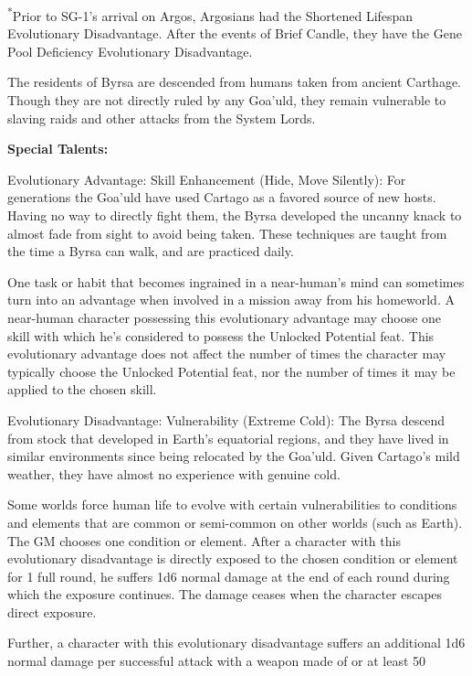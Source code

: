 \textsuperscript{*}Prior to SG-1's arrival on Argos, Argosians had the Shortened Lifespan Evolutionary Disadvantage. After the events of Brief Candle, they have the Gene Pool Deficiency Evolutionary Disadvantage.


The residents of Byrsa are descended from humans taken from ancient Carthage. Though they are not directly ruled by any Goa'uld, they remain vulnerable to slaving raids and other attacks from the System Lords.

\textbf{Special Talents:}
\begin{itemize*}
\item Evolutionary Advantage: Skill Enhancement (Hide, Move Silently): For generations the Goa'uld have used Cartago as a favored source of new hosts. Having no way to directly fight them, the Byrsa developed the uncanny knack to almost fade from sight to avoid being taken. These techniques are taught from the time a Byrsa can walk, and are practiced daily.

One task or habit that becomes ingrained in a near-human's mind can sometimes turn into an advantage when involved in a mission away from his homeworld. A near-human character possessing this evolutionary advantage may choose one skill with which he's considered to possess the Unlocked Potential feat. This evolutionary advantage does not affect the number of times the character may typically choose the Unlocked Potential feat, nor the number of times it may be applied to the chosen skill.
\item Evolutionary Disadvantage: Vulnerability (Extreme Cold): The Byrsa descend from stock that developed in Earth's equatorial regions, and they have lived in similar environments since being relocated by the Goa'uld. Given Cartago's mild weather, they have almost no experience with genuine cold.

Some worlds force human life to evolve with certain vulnerabilities to conditions and elements that are common or semi-common on other worlds (such as Earth). The GM chooses one condition or element. After a character with this evolutionary disadvantage is directly exposed to the chosen condition or element for 1 full round, he suffers 1d6 normal damage at the end of each round during which the exposure continues. The damage ceases when the character escapes direct exposure.

Further, a character with this evolutionary disadvantage suffers an additional 1d6 normal damage per successful attack with a weapon made of or at least 50%


\end{itemize*}
